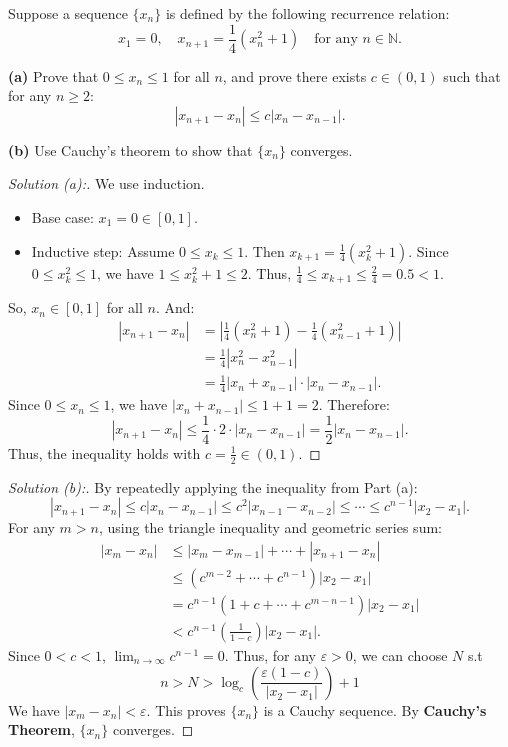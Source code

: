\documentclass[
	UTF-8,
	11pt, %
	a4paper, %
]{LegrandOrangeBook}
\begin{document}
    \begin{example}
    Suppose a sequence $\{x_n\}$ is defined by the following recurrence relation:
    \[ x_1 = 0, \quad x_{n+1} = \frac{1}{4}(x_n^2 + 1) \quad \text{for any } n \in \mathbb{N}. \]

    \textbf{(a)} Prove that $0 \le x_n \le 1$ for all $n$, and prove there exists $c \in (0, 1)$ such that for any $n \ge 2$:
    \[ |x_{n+1} - x_n| \le c |x_n - x_{n-1}|. \]

    \textbf{(b)} Use Cauchy's theorem to show that $\{x_n\}$ converges.

    \begin{proof}[Solution (a):]
        We use induction.
        \begin{itemize}[itemsep = 0.5em, topsep = 0.5em]
            \item Base case: $x_1 = 0 \in [0, 1]$.
            \item Inductive step: Assume $0 \le x_k \le 1$. Then $x_{k+1} = \frac{1}{4}(x_k^2 + 1)$.
            Since $0 \le x_k^2 \le 1$, we have $1 \le x_k^2 + 1 \le 2$.
            Thus, $\frac{1}{4} \le x_{k+1} \le \frac{2}{4} = 0.5 < 1$.
        \end{itemize}
        So, $x_n \in [0, 1]$ for all $n$. And:
        \[
        \begin{aligned}
        |x_{n+1} - x_n| &= \left| \frac{1}{4}(x_n^2 + 1) - \frac{1}{4}(x_{n-1}^2 + 1) \right| \\
        &= \frac{1}{4} |x_n^2 - x_{n-1}^2| \\
        &= \frac{1}{4} |x_n + x_{n-1}| \cdot |x_n - x_{n-1}|.
        \end{aligned}
        \]
        Since $0 \le x_n \le 1$, we have $|x_n + x_{n-1}| \le 1 + 1 = 2$. Therefore:
        \[ |x_{n+1} - x_n| \le \frac{1}{4} \cdot 2 \cdot |x_n - x_{n-1}| = \frac{1}{2} |x_n - x_{n-1}|. \]
        Thus, the inequality holds with $c = \frac{1}{2} \in (0, 1)$.
    \end{proof}
    \begin{proof}[Solution (b):]
        By repeatedly applying the inequality from Part (a):
        \[ |x_{n+1} - x_n| \le c |x_n - x_{n-1}| \le c^2 |x_{n-1} - x_{n-2}| \le \cdots \le c^{n-1} |x_2 - x_1|. \]
        For any $m > n$, using the triangle inequality and geometric series sum:
        \[
        \begin{aligned}
        |x_m - x_n| &\le |x_m - x_{m-1}| + \cdots + |x_{n+1} - x_n| \\
        &\le (c^{m-2} + \cdots + c^{n-1}) |x_2 - x_1| \\
        &= c^{n-1} (1 + c + \cdots + c^{m-n-1}) |x_2 - x_1| \\
        &< c^{n-1} \left( \frac{1}{1-c} \right) |x_2 - x_1|.
        \end{aligned}
        \]
        Since $0 < c < 1$, $\lim_{n \to \infty} c^{n-1} = 0$.
        Thus, for any $\varepsilon > 0$, we can choose $N$  s.t 
        $$n > N > \log_c \left(\frac{\varepsilon (1-c)}{|x_2-x_1|}\right)+1$$
        We have $|x_m - x_n| < \varepsilon$. This proves $\{x_n\}$ is a Cauchy sequence. By \textbf{Cauchy's Theorem}, $\{x_n\}$ converges.
    \end{proof}
    \end{example}
\end{document}
